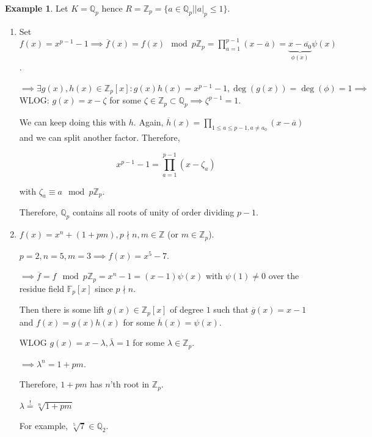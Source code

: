 \documentclass[openany]{amsbook}
\numberwithin{section}{chapter}
\theoremstyle{definition}
\newtheorem*{example}{Example}
\begin{document}
\begin{example}
    Let \(K = \mathbb{Q}_p\) hence \(R = \mathbb{Z}_p = \{ a\in\mathbb{Q}_p \mid \vert a \vert _p \leq 1 \}\).

    \begin{enumerate}[label=\arabic*)]
        \item Set \(f(x) = x^{p-1} - 1 \implies \overline{f}(x) = f(x) \mod p \mathbb{Z}_p = \prod_{a = 1}^{p-1} (x-\overline{a}) = \underbrace{x-\overline{a_0}}_{\phi(x)}\psi (x)\).
        
        \(\implies \exists g(x), h(x) \in \mathbb{Z}_p[x] : g(x)h(x)=x^{p-1} - 1, \deg(g(x))=\deg(\phi)=1 \implies\) WLOG: \(g(x) = x-\zeta\) for some \(\zeta \in \mathbb{Z}_p \subset \mathbb{Q}_p \implies \zeta^{p-1} = 1\).

        We can keep doing this with \(h\). Again, \(\overline{h}(x) = \prod_{1 \leq a \leq p-1, a \neq a_0} (x-\overline{a})\) and we can split another factor. Therefore,

        \[
            x^{p-1} - 1 = \prod_{a=1}^{p-1} (x-\zeta_a)
        \]

        with \(\zeta_a \equiv a \mod p\mathbb{Z}_p\).

        Therefore, \(\mathbb{Q}_p\) contains all roots of unity of order dividing \(p-1\).

        \item \(f(x) = x^n + (1+pm), p\nmid n, m\in \mathbb{Z}\) (or \(m\in\mathbb{Z}_p\)).
        
        \(p = 2, n = 5, m = 3 \implies f(x) = x^5 - 7\).

        \(\implies \overline{f} = f \mod p \mathbb{Z}_p = x^n - 1 = (x-1) \psi(x)\) with \(\psi(1)\neq 0\) over the residue field \(\mathbb{F}_p[x]\) since \(p\nmid n\).
        
        Then there is some lift \(g(x)\in \mathbb{Z}_p[x]\) of degree \(1\) such that \(\overline{g}(x) = x-1\) and \(f(x)=g(x)h(x)\) for some \(\overline{h}(x) = \psi(x)\).

        WLOG \(g(x) = x - \lambda, \overline{\lambda} = 1\) for some \(\lambda \in \mathbb{Z}_p\).
        
        \(\implies \lambda^n = 1 + pm\).

        Therefore, \(1+pm\) has \(n\)'th root in \(\mathbb{Z}_p\).

        \(\lambda \overset{!}{=} \sqrt[n]{1+pm} \) 

        For example, \(\sqrt[5]{7} \in \mathbb{Q}_2\). 
    
    \end{enumerate} 
\end{example}
\end{document}
